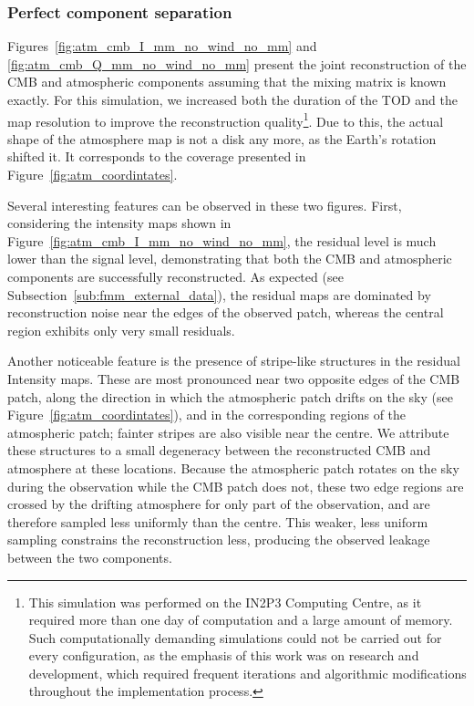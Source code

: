 \documentclass[../../thesis.tex]{subfiles}
\begin{document}
\subsubsection{Perfect component separation}

Figures~\ref{fig:atm_cmb_I_mm_no_wind_no_mm} and \ref{fig:atm_cmb_Q_mm_no_wind_no_mm} present the joint reconstruction of the CMB and atmospheric components assuming that the mixing matrix is known exactly. For this simulation, we increased both the duration of the TOD and the map resolution to improve the reconstruction quality\footnote{This simulation was performed on the IN2P3 Computing Centre, as it required more than one day of computation and a large amount of memory. Such computationally demanding simulations could not be carried out for every configuration, as the emphasis of this work was on research and development, which required frequent iterations and algorithmic modifications throughout the implementation process.}. Due to this, the actual shape of the atmosphere map is not a disk any more, as the Earth's rotation shifted it. It corresponds to the coverage presented in Figure~\ref{fig:atm_coordintates}.

Several interesting features can be observed in these two figures. First, considering the intensity maps shown in Figure~\ref{fig:atm_cmb_I_mm_no_wind_no_mm}, the residual level is much lower than the signal level, demonstrating that both the CMB and atmospheric components are successfully reconstructed. As expected (see Subsection~\ref{sub:fmm_external_data}), the residual maps are dominated by reconstruction noise near the edges of the observed patch, whereas the central region exhibits only very small residuals.

Another noticeable feature is the presence of stripe-like structures in the residual Intensity maps. These are most pronounced near two opposite edges of the CMB patch, along the direction in which the atmospheric patch drifts on the sky (see Figure~\ref{fig:atm_coordintates}), and in the corresponding regions of the atmospheric patch; fainter stripes are also visible near the centre. We attribute these structures to a small degeneracy between the reconstructed CMB and atmosphere at these locations. Because the atmospheric patch rotates on the sky during the observation while the CMB patch does not, these two edge regions are crossed by the drifting atmosphere for only part of the observation, and are therefore sampled less uniformly than the centre. This weaker, less uniform sampling constrains the reconstruction less, producing the observed leakage between the two components.
\end{document}
